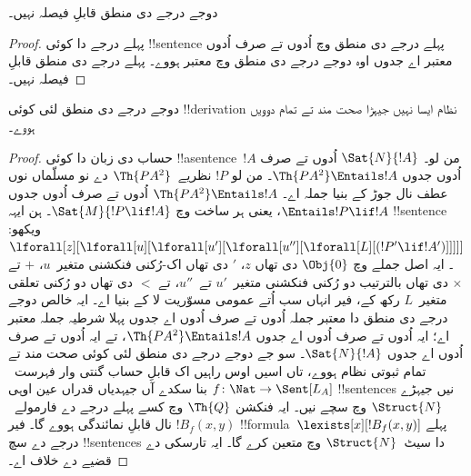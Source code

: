 \documentclass[../../../include/open-logic-section]{subfiles}
\begin{document}


\begin{thm}
دوجے درجے دی منطق قابلِ فیصلہ نہیں۔
\end{thm}

\begin{proof}
پہلے درجے دا کوئی !!{sentence} پہلے درجے دی منطق وچ اُدوں تے صرف
اُدوں معتبر اے جدوں اوہ دوجے درجے دی منطق وچ معتبر ہووے۔
پہلے درجے دی منطق قابلِ فیصلہ نہیں۔
\end{proof}

\begin{thm}
دوجے درجے دی منطق لئی کوئی !!{derivation} نظام ایسا نہیں
جیہڑا صحت مند تے تمام دوویں ہووے۔
\end{thm}

\begin{proof}
حساب دی زبان دا کوئی !!a{sentence}~$!A$ من لو۔
$\Sat{N}{!A}$ اُدوں تے صرف اُدوں جدوں $\Th{PA^2} \Entails !A$۔
من لو $!P$ نظریے~$\Th{PA^2}$ دے نو مسلّماں نوں عطف نال جوڑ کے بنیا جملہ اے۔
$\Th{PA^2} \Entails !A$ اُدوں تے صرف اُدوں جدوں
$\Entails !P \lif !A$، یعنی ہر ساخت وچ
$\Sat{M}{!P \lif !A}$۔ ہن ایہہ !!{sentence} ویکھو:
$\lforall[z][\lforall[u][\lforall[u'][\lforall[u''][\lforall[L][(!P' \lif !A')]]]]]$۔
ایہ اصل جملے وچ $\Obj{0}$ دی تھاں $z$، $\prime$ دی تھاں
اک-رُکنی فنکشنی متغیر~$u$، $+$ تے $\times$ دی تھاں بالترتیب
دو رُکنی فنکشنی متغیر~$u'$ تے~$u''$، تے $<$ دی تھاں
دو رُکنی تعلقی متغیر~$L$ رکھ کے، فیر انہاں سب اُتے عمومی
مسوّریت لا کے بنیا اے۔ ایہ خالص دوجے درجے دی منطق دا
معتبر جملہ اُدوں تے صرف اُدوں اے جدوں پہلا شرطیہ جملہ معتبر اے؛
ایہ اُدوں تے صرف اُدوں اے جدوں $\Th{PA^2} \Entails !A$،
تے ایہ اُدوں تے صرف اُدوں اے جدوں $\Sat{N}{!A}$۔
سو جے دوجے درجے دی منطق لئی کوئی صحت مند تے تمام
ثبوتی نظام ہووے، تاں اسیں اوس راہیں اک قابلِ حساب گنتی وار
فہرست~$f\colon \Nat \to \Sent[L_A]$ بنا سکدے آں جیہدیاں
قدراں عین اوہی !!{sentence}s نیں جیہڑے $\Struct{N}$ وچ سچے نیں۔ ایہ فنکشن
$\Th{Q}$ وچ کسے پہلے درجے دے فارمولے~$!B_f(x, y)$ نال
قابلِ نمائندگی ہووے گا۔ فیر !!{formula}~$\lexists[x][!B_f(x, y)]$
پہلے درجے دے سچ !!{sentence}s دا سیٹ~$\Struct{N}$ وچ متعین
کرے گا۔ ایہ تارسکی دے قضیے دے خلاف اے۔
\end{proof}
\end{document}

